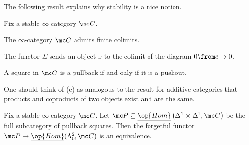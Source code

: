\documentclass[../notes.tex]{subfiles}
\begin{document}
The following result explains why stability is a nice notion.
\begin{proposition} \label{prop:stability-is-good}
	Fix a stable $\infty$-category $\mc C$.
	\begin{listalph}
		\item The $\infty$-category $\mc C$ admits finite colimits.
		\item The functor $\Sigma$ sends an object $x$ to the colimit of the diagram $0\from c\to 0$.
		\item A square in $\mc C$ is a pullback if and only if it is a pushout.
	\end{listalph}
\end{proposition}
\begin{remark}
	One should think of (c) as analogous to the result for additive categories that products and coproducts of two objects exist and are the same.
\end{remark}
\begin{lemma} \label{lem:use-stability}
	Fix a stable $\infty$-category $\mc C$. Let $\mc P\subseteq\underline{\op{Hom}}\left(\Delta^1\times\Delta^1,\mc C\right)$ be the full subcategory of pullback squares. Then the forgetful functor $\mc P\to\underline{\op{Hom}}(\Lambda^2_0,\mc C)$ is an equivalence.
\end{lemma}
\end{document}

